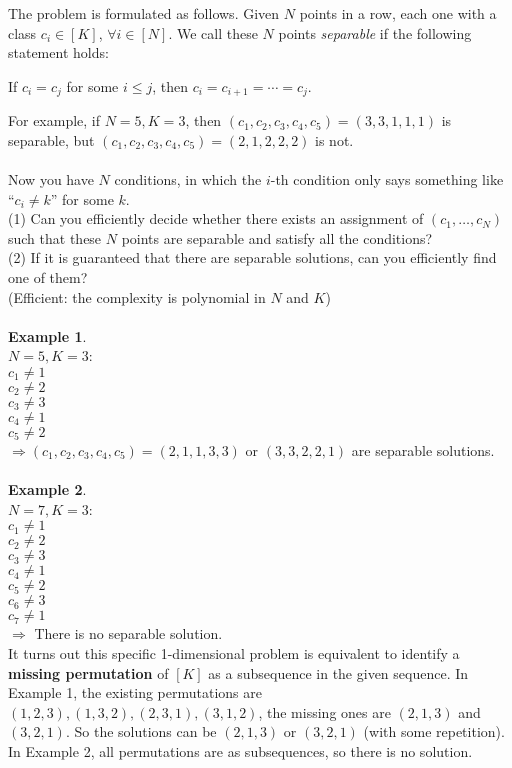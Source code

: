 \documentclass{article}
\begin{document}
The problem is formulated as follows. 
Given $N$ points in a row, each one with a class $c_i\in [K]$, $\forall i\in [N]$. We call these $N$ points \textit{separable} if the following statement holds: 
\begin{center}
    If $c_i=c_j$ for some $i\leq j$, then $c_i=c_{i+1}=\cdots=c_j$.
\end{center}
For example, if $N=5, K=3$, then $(c_1,c_2, c_3, c_4,c_5)=(3,3,1,1,1)$ is separable, but $(c_1,c_2,c_3,c_4,c_5)=(2,1,2,2,2)$ is not. 
\ \\
\ \\
Now you have $N$ conditions, in which the $i$-th condition only says something like ``$c_i\neq k$'' for some $k$. \\
(1) Can you efficiently decide whether there exists an assignment of $(c_1,\ldots,c_N)$ such that these $N$ points are separable and satisfy all the conditions? \\
(2) If it is guaranteed that there are separable solutions, can you efficiently find one of them?\\ (Efficient: the complexity is polynomial in $N$ and $K$)
\ \\
\ \\
\textbf{Example 1}. \\
$N=5, K=3$: \\
$c_1\neq 1$ \\
$c_2\neq 2$ \\
$c_3\neq 3$ \\
$c_4\neq 1$ \\
$c_5\neq 2$ \\
$\Rightarrow (c_1,c_2,c_3,c_4,c_5)=(2,1,1,3,3)$ or $(3,3,2,2,1)$ are separable solutions. \\
\ \\
\textbf{Example 2}. \\
$N=7, K=3$: \\
$c_1\neq 1$ \\
$c_2\neq 2$ \\
$c_3\neq 3$ \\
$c_4\neq 1$ \\
$c_5\neq 2$ \\
$c_6\neq 3$ \\
$c_7\neq 1$ \\
$\Rightarrow$ There is no separable solution. \\

It turns out this specific 1-dimensional problem is equivalent to identify a \textbf{missing permutation} of $[K]$ as a subsequence in the given sequence. In Example 1, the existing permutations are $(1,2,3), (1,3,2), (2,3,1), (3,1,2)$, the missing ones are $(2,1,3)$ and $(3,2,1)$.  So the solutions can be $(2,1,3)$ or $(3,2,1)$ (with some repetition). In Example 2, all permutations are as subsequences, so there is no solution. 
\end{document}
